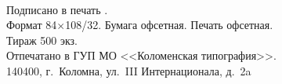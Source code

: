 ~
\vfill
\centering
\begin{minipage}{0.8\tw}
	\small
	\centering
	Подписано в печать \signed.\\
	Формат 84$\times$108/32. Бумага офсетная. Печать офсетная.\\
	Тираж 500 экз.\\ 
	Отпечатано в ГУП МО <<Коломенская типография>>.\\ 140400, г.~Коломна, ул.~III Интернационала, д.~2a
\end{minipage}
\label{pg:last-page}
